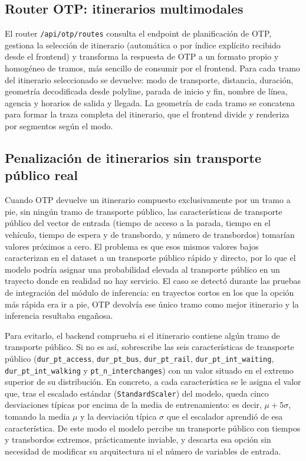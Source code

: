 \subsection{Router OTP: itinerarios multimodales}
\label{subsec:impl_backend_otp}

El router \texttt{/api/otp/routes} consulta el endpoint de planificación de OTP, gestiona la selección de itinerario (automática o por índice explícito recibido desde el frontend) y transforma la respuesta de OTP a un formato propio y homogéneo de tramos, más sencillo de consumir por el frontend. Para cada tramo del itinerario seleccionado se devuelve: modo de transporte, distancia, duración, geometría decodificada desde polyline, parada de inicio y fin, nombre de línea, agencia y horarios de salida y llegada. La geometría de cada tramo se concatena para formar la traza completa del itinerario, que el frontend divide y renderiza por segmentos según el modo.

\subsection{Penalización de itinerarios sin transporte público real}
\label{subsec:impl_backend_penalizacion}

Cuando OTP devuelve un itinerario compuesto exclusivamente por un tramo a pie, sin ningún tramo de transporte público, las características de transporte público del vector de entrada (tiempo de acceso a la parada, tiempo en el vehículo, tiempo de espera y de transbordo, y número de transbordos) tomarían valores próximos a cero. El problema es que esos mismos valores bajos caracterizan en el dataset a un transporte público rápido y directo, por lo que el modelo podría asignar una probabilidad elevada al transporte público en un trayecto donde en realidad no hay servicio. El caso se detectó durante las pruebas de integración del módulo de inferencia: en trayectos cortos en los que la opción más rápida era ir a pie, OTP devolvía ese único tramo como mejor itinerario y la inferencia resultaba engañosa.

Para evitarlo, el backend comprueba si el itinerario contiene algún tramo de transporte público. Si no es así, sobrescribe las seis características de transporte público (\texttt{dur\_pt\_access}, \texttt{dur\_pt\_bus}, \texttt{dur\_pt\_rail}, \texttt{dur\_pt\_int\_waiting}, \texttt{dur\_pt\_int\_walking} y \texttt{pt\_n\_interchanges}) con un valor situado en el extremo superior de su distribución. En concreto, a cada característica se le asigna el valor que, tras el escalado estándar (\texttt{StandardScaler}) del modelo, queda cinco desviaciones típicas por encima de la media de entrenamiento: es decir, $\mu + 5\sigma$, tomando la media $\mu$ y la desviación típica $\sigma$ que el escalador aprendió de esa característica. De este modo el modelo percibe un transporte público con tiempos y transbordos extremos, prácticamente inviable, y descarta esa opción sin necesidad de modificar su arquitectura ni el número de variables de entrada.

